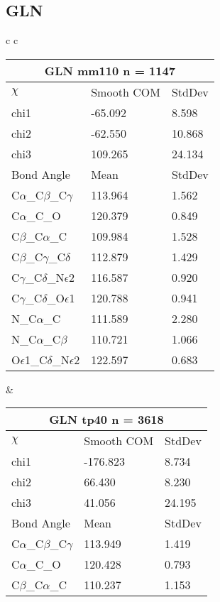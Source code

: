 \newpage
\subsection{GLN}

\begin{longtable}{ c c }

  \begin{tabular}{ l l l }
  \toprule
  \multicolumn{3}{c}{GLN \textbf{mm110} n = 1147} \\ \toprule
  $\chi$       & Smooth COM & StdDev \\ \midrule
  chi1 & -65.092 & 8.598 \\ 
  chi2 & -62.550 & 10.868 \\ 
  chi3 & 109.265 & 24.134 \\ \midrule
  Bond Angle   & Mean     & StdDev \\ \midrule
  C$\alpha$\_C$\beta$\_C$\gamma$ & 113.964 & 1.562\\
  C$\alpha$\_C\_O & 120.379 & 0.849\\
  C$\beta$\_C$\alpha$\_C & 109.984 & 1.528\\
  C$\beta$\_C$\gamma$\_C$\delta$ & 112.879 & 1.429\\
  C$\gamma$\_C$\delta$\_N$\epsilon$2 & 116.587 & 0.920\\
  C$\gamma$\_C$\delta$\_O$\epsilon$1 & 120.788 & 0.941\\
  N\_C$\alpha$\_C & 111.589 & 2.280\\
  N\_C$\alpha$\_C$\beta$ & 110.721 & 1.066\\
  O$\epsilon$1\_C$\delta$\_N$\epsilon$2 & 122.597 & 0.683\\
  \bottomrule
  \end{tabular}
  &
  \begin{tabular}{ l l l }
  \toprule
  \multicolumn{3}{c}{GLN \textbf{tp40} n = 3618} \\ \toprule
  $\chi$       & Smooth COM & StdDev \\ \midrule
  chi1 & -176.823 & 8.734 \\ 
  chi2 & 66.430 & 8.230 \\ 
  chi3 & 41.056 & 24.195 \\ \midrule
  Bond Angle   & Mean     & StdDev \\ \midrule
  C$\alpha$\_C$\beta$\_C$\gamma$ & 113.949 & 1.419\\
  C$\alpha$\_C\_O & 120.428 & 0.793\\
  C$\beta$\_C$\alpha$\_C & 110.237 & 1.153\\

\end{tabular}
\end{longtable}
